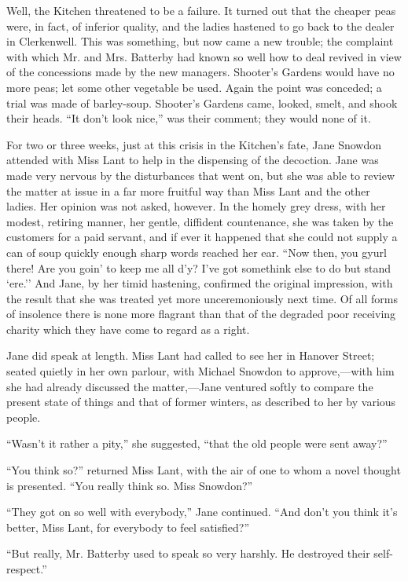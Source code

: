 {}Well, the Kitchen threatened to be a failure. It turned out that the
cheaper peas were, in fact, of inferior quality, and the ladies hastened
to go back to the dealer in Clerkenwell. This was something, but now
came a new trouble; the complaint with which Mr. and Mrs. Batterby had
known so well how to deal revived in view of the concessions made by the
new managers. Shooter's Gardens would have no more peas; let some other
vegetable be used. Again the point was conceded; a trial was made of
barley-soup. Shooter's Gardens came, looked, smelt, and shook their
heads. ``It don't look nice,'' was their comment; they would none of it.

For two or three weeks, just at this crisis in the Kitchen's fate, Jane
Snowdon attended with Miss Lant to help in the dispensing of the
decoction. Jane was made very nervous by the disturbances that went on,
but she was able to review the matter at issue in a far more fruitful
way than Miss Lant and the other ladies. Her opinion was not asked,
however. In the homely grey dress, with her modest, retiring manner, her
gentle, diffident countenance, she was taken by the customers for a
{}paid servant, and if ever it happened that she could not supply a can
of soup quickly enough sharp words reached her ear. ``Now then, you
gyurl there! Are you goin' to keep me all d'y? I've got somethink else
to do but stand `ere.'' And Jane, by her timid hastening, confirmed the
original impression, with the result that she was treated yet more
unceremoniously next time. Of all forms of insolence there is none more
flagrant than that of the degraded poor receiving charity which they
have come to regard as a right.

Jane did speak at length. Miss Lant had called to see her in Hanover
Street; seated quietly in her own parlour, with Michael Snowdon to
approve,---with him she had already discussed the matter,---Jane
ventured softly to compare the present state of things and that of
former winters, as described to her by various people.

``Wasn't it rather a pity,'' she suggested, ``that the old people were
sent away?''

``You think so?'' returned Miss Lant, with the air of one to whom a
novel thought is presented. ``You really think so. Miss Snowdon?''

``They got on so well with everybody,'' {}Jane continued. ``And don't
you think it's better, Miss Lant, for everybody to feel satisfied?''

``But really, Mr. Batterby used to speak so very harshly. He destroyed
their self-respect.''

